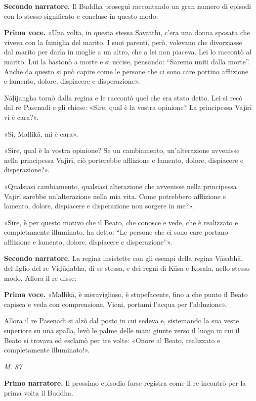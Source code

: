 \textbf{Secondo narratore.} Il Buddha proseguì raccontando un gran numero di
episodi con lo stesso significato e concluse in questo modo:


\textbf{Prima voce.} «Una volta, in questa stessa Sāvatthī, c’era una donna
sposata che viveva con la famiglia del marito. I suoi parenti, però,
volevano che divorziasse dal marito per darla in moglie a un altro, che
a lei non piaceva. Lei lo raccontò al marito. Lui la bastonò a morte e
si uccise, pensando: “Saremo uniti dalla morte”. Anche da questo si può
capire come le persone che ci sono care portino afflizione e lamento,
dolore, dispiacere e disperazione».


Nāḷijangha tornò dalla regina e le raccontò quel che era stato detto.
Lei si recò dal re Pasenadi e gli chiese: «Sire, qual è la vostra
opinione? La principessa Vajirī vi è cara?».


«Si, Mallikā, mi è cara».


«Sire, qual è la vostra opinione? Se un cambiamento, un’alterazione
avvenisse nella principessa Vajirī, ciò porterebbe afflizione e lamento,
dolore, dispiacere e disperazione?».


«Qualsiasi cambiamento, qualsiasi alterazione che avvenisse nella
principessa Vajirī sarebbe un’alterazione nella mia vita. Come
potrebbero afflizione e lamento, dolore, dispiacere e disperazione non
sorgere in me?».


«Sire, è per questo motivo che il Beato, che conosce e vede, che è
realizzato e completamente illuminato, ha detto: “Le persone che ci sono
care portano afflizione e lamento, dolore, dispiacere e disperazione”».


\textbf{Secondo narratore.} La regina insistette con gli esempi della regina
Vāsabhā, del figlio del re Viḍūḍabha, di se stessa, e dei regni di Kāsa
e Kosala, nello stesso modo. Allora il re disse:


\textbf{Prima voce.} «Mallikā, è meraviglioso, è stupefacente, fino a che punto
il Beato capisca e veda con comprensione. Vieni, portami l’acqua per
l’abluzione».


Allora il re Pasenadi si alzò dal posto in cui sedeva e, sistemando la
sua veste superiore su una spalla, levò le palme delle mani giunte verso
il luogo in cui il Beato si trovava ed esclamò per tre volte: «Onore al
Beato, realizzato e completamente illuminato!».


\emph{M. 87}


\textbf{Primo narratore.} Il prossimo episodio forse registra come il re
incontrò per la prima volta il Buddha.


